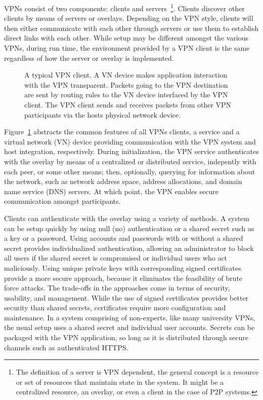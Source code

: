VPNs consist of two components: clients and servers~\footnote{The definition of
a server is VPN dependent, the general concept is a resource or set of
resources that maintain state in the system.  It might be a centralized
resource, an overlay, or even a client in the case of P2P systems.}.  Clients
discover other clients by means of servers or overlays.  Depending on the VPN
style, clients will then either communicate with each other through servers or
use them to establish direct links with each other.  While setup may be
different amongst the various VPNs, during run time, the environment provided
by a VPN client is the same regardless of how the server or overlay is
implemented.  

\begin{figure}
\centering
{}

\caption[A typical VPN client]{A typical VPN client.  A VN device makes
application interaction with the VPN transparent.  Packets going to the VPN
destination are sent by routing rules to the VN device interfaced by the VPN
client.  The VPN client sends and receives packets from other VPN participants
via the hosts physical network device.}

\label{fig:vpn}
\end{figure}

Figure~\ref{fig:vpn} abstracts the common features of all VPNs clients, a
service and a virtual network (VN) device providing communication with the VPN
system and host integration, respectively.  During initialization, the VPN
service authenticates with the overlay by means of a centralized or distributed
service, indepently with each peer, or some other means; then, optionally,
querying for information about the network, such as network address space,
address allocations, and domain name service (DNS) servers.  At which point,
the VPN enables secure communication amongst participants.

Clients can authenticate with the overlay using a variety of methods.  A system
can be setup quickly by using null (no) authentication or a shared secret such
as a key or a password.  Using accounts and passwords with or without a shared
secret provides individualized authentication, allowing an administrator to
block all users if the shared secret is compromised or individual users who act
maliciously.  Using unique private keys with corresponding signed certificates
provide a more secure approach, because it eliminates the feasibility of brute
force attacks.  The trade-offs in the approaches come in terms of security,
usability, and management.  While the use of signed certificates provides
better security than shared secrets, certificates require more configuration
and maintenance.  In a system comprising of non-experts, like many university
VPNs, the usual setup uses a shared secret and individual user accounts.
Secrets can be packaged with the VPN application, so long as it is distributed
through secure channels such as authenticated HTTPS.

